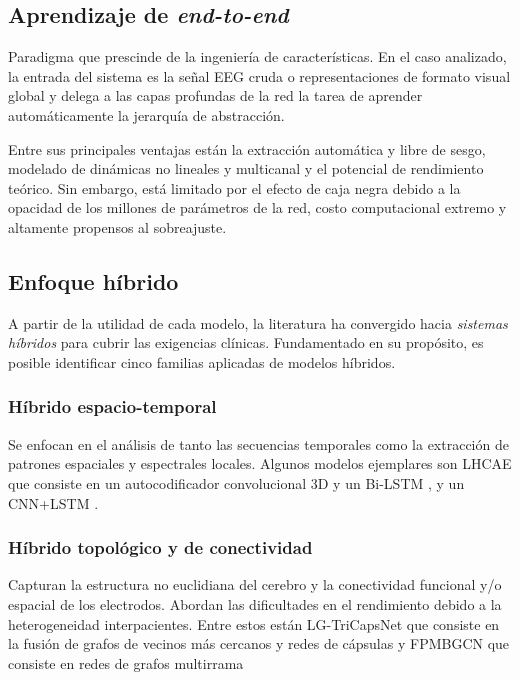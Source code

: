 \subsection{Aprendizaje de \textit{end-to-end}}
Paradigma que prescinde de la ingeniería de características. En el caso analizado, la entrada del sistema es la señal EEG cruda o representaciones de formato visual global y delega a las capas profundas de la red la tarea de aprender automáticamente la jerarquía de abstracción.

Entre sus principales ventajas están la extracción automática y libre de sesgo, modelado de dinámicas no lineales y multicanal y el potencial de rendimiento teórico. Sin embargo, está limitado por el efecto de caja negra debido a la opacidad de los millones de parámetros de la red, costo computacional extremo y altamente propensos al sobreajuste.

\subsection{Enfoque híbrido}
A partir de la utilidad de cada modelo, la literatura ha convergido hacia \textit{sistemas híbridos} para cubrir las exigencias clínicas. Fundamentado en su propósito, es posible identificar cinco familias aplicadas de modelos híbridos.

\subsubsection{Híbrido espacio-temporal}
Se enfocan en el análisis de tanto las secuencias temporales como la extracción de patrones espaciales y espectrales locales. Algunos modelos ejemplares son LHCAE que consiste en un autocodificador convolucional 3D y un Bi-LSTM \cite{srinivasan2023detection}, y un CNN+LSTM \cite{dasEnhancedEEGSignal2025}. 

\subsubsection{Híbrido topológico y de conectividad}
Capturan la estructura no euclidiana del cerebro y la conectividad funcional y/o espacial de los electrodos. Abordan las dificultades en el rendimiento debido a la heterogeneidad interpacientes. Entre estos están LG-TriCapsNet que consiste en la fusión de grafos de vecinos más cercanos y redes de cápsulas \cite{jain2025lg} y FPMBGCN que consiste en redes de grafos multirrama \cite{zhangFPMBGCNFeaturePyramidbased2026}

